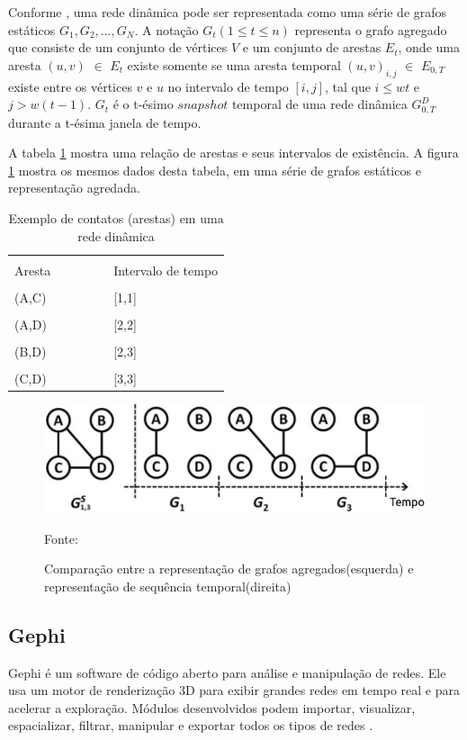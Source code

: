 Conforme \cite{kim}, uma rede dinâmica pode ser representada como uma série de grafos estáticos
$G_1, G_2, ..., G_N$. A notação $G_t(1 \leqslant t \leqslant n)$ representa o grafo agregado que consiste
de um conjunto de vértices $V$ e um conjunto de arestas $E_t$, onde uma aresta $(u,v)$ $\in$ $E_t$ existe
somente se uma aresta temporal $(u,v)_{i,j}$ $\in$ $E_{0,T}$ existe entre os vértices $v$ e $u$ no intervalo
de tempo $[i,j]$, tal que $i \leqslant wt$ e $j > w(t-1)$. $G_t$ é o t-ésimo $snapshot$ temporal de uma
rede dinâmica $G^D_{0,T}$ durante a t-ésima janela de tempo.

A tabela \ref{tab:kim} mostra uma relação de arestas e seus intervalos de existência. A figura \ref{fig:grafoKim} mostra os mesmos
dados desta tabela, em uma série de grafos estáticos e representação agredada.

\begin{table}[htbp]
	\centering
	\begin{tabular}{l l l l l l}
	\toprule
	\\Aresta & & & & & Intervalo de tempo\\
	\midrule
	\\(A,C) & & & & & [1,1]\\
	\\(A,D) & & & & & [2,2]\\
	\\(B,D) & & & & & [2,3]\\
	\\(C,D) & & & & & [3,3]\\
	\bottomrule
	\end{tabular}
\caption{Exemplo de contatos (arestas) em uma rede dinâmica}
 \label{tab:kim}
\end{table}

\begin{figure}[htbp]
\centering
 \includegraphics[width=.55\textwidth]{chapters/fig/kim.png}
\caption{Comparação entre a representação de grafos agregados(esquerda) e representação de sequência temporal(direita)}
Fonte: \cite{kim}
\label{fig:grafoKim}
\end{figure}
\FloatBarrier

\subsection{Gephi}
Gephi é um software de código aberto para análise e manipulação de redes.
Ele usa um motor de renderização 3D para exibir grandes redes em tempo real e para acelerar a exploração.
Módulos desenvolvidos podem importar, visualizar, espacializar, filtrar, manipular e exportar todos os tipos de redes \cite{gephi}.

